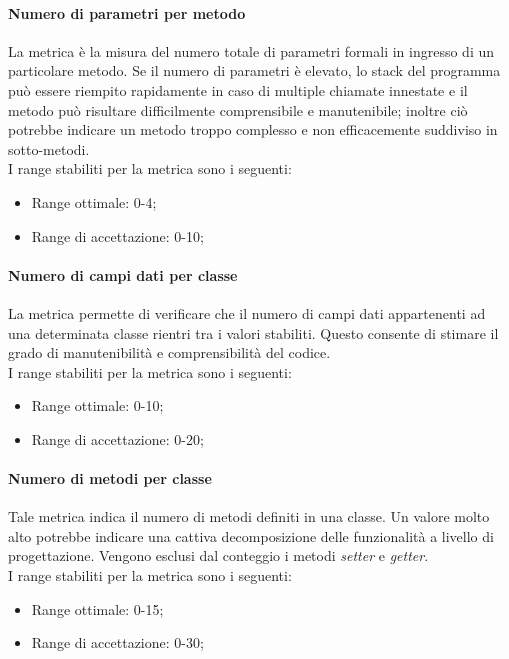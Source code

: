 			\paragraph{Numero di parametri per metodo}
			La metrica è la misura del numero totale di parametri formali in ingresso di un particolare metodo. Se il numero di parametri è elevato, lo stack del programma può essere riempito rapidamente in caso di multiple chiamate innestate e il metodo può risultare difficilmente comprensibile e manutenibile; inoltre ciò potrebbe indicare un metodo troppo complesso e non efficacemente suddiviso in sotto-metodi.
			\\I range stabiliti per la metrica sono i seguenti:
			\begin{itemize}
				\item Range ottimale: 0-4;
				\item Range di accettazione: 0-10;
			\end{itemize}
			
			\paragraph{Numero di campi dati per classe}
			La metrica permette di verificare che il numero di campi dati appartenenti ad una determinata classe rientri tra i valori stabiliti. Questo consente di stimare il grado di manutenibilità e comprensibilità del codice.
			\\I range stabiliti per la metrica sono i seguenti:
			\begin{itemize}
				\item Range ottimale: 0-10;
				\item Range di accettazione: 0-20;
			\end{itemize}
			
			\paragraph{Numero di metodi per classe}
			Tale metrica indica il numero di metodi definiti in una classe. Un valore molto alto potrebbe indicare una cattiva decomposizione delle funzionalità a livello di progettazione. Vengono esclusi dal conteggio i metodi \textit{setter} e \textit{getter}.
			\\I range stabiliti per la metrica sono i seguenti:
			\begin{itemize}
				\item Range ottimale: 0-15;
				\item Range di accettazione: 0-30;
			\end{itemize}
			
